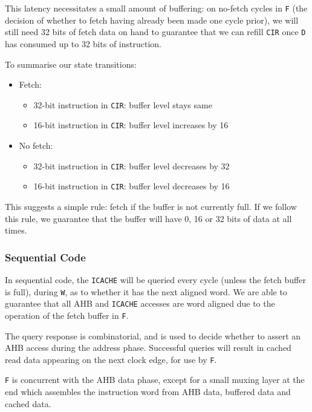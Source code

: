 \documentclass{article}
\begin{document}
This latency necessitates a small amount of buffering: on no-fetch cycles in \texttt{F} (the decision of whether to fetch having already been made one cycle prior), we will still need 32 bits of fetch data on hand to guarantee that we can refill \texttt{CIR} once \texttt{D} has consumed up to 32 bits of instruction.

To summarise our state transitions:

\begin{itemize}
\item Fetch:
	\begin{itemize}
	\item 32-bit instruction in \texttt{CIR}: buffer level stays same
	\item 16-bit instruction in \texttt{CIR}: buffer level increases by 16
	\end{itemize}
\item No fetch:
	\begin{itemize}
	\item 32-bit instruction in \texttt{CIR}: buffer level decreases by 32
	\item 16-bit instruction in \texttt{CIR}: buffer level decreases by 16
	\end{itemize}
\end{itemize}

This suggests a simple rule: fetch if the buffer is not currently full. If we follow this rule, we guarantee that the buffer will have 0, 16 or 32 bits of data at all times.

\subsubsection{Sequential Code}

In sequential code, the \texttt{ICACHE} will be queried every cycle (unless the fetch buffer is full), during \texttt{W}, as to whether it has the next aligned word. We are able to guarantee that all AHB and \texttt{ICACHE} accesses are word aligned due to the operation of the fetch buffer in \texttt{F}.

The query response is combinatorial, and is used to decide whether to assert an AHB access during the address phase. Successful queries will result in cached read data appearing on the next clock edge, for use by \texttt{F}.

\texttt{F} is concurrent with the AHB data phase, except for a small muxing layer at the end which assembles the instruction word from AHB data, buffered data and cached data.
\end{document}
